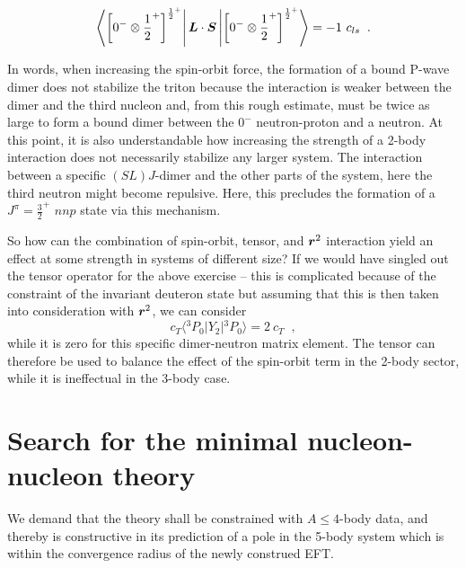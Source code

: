 \documentclass[aps,prd,twocolumn
,tightenlines,letterpaper,
nofootinbib]{revtex4-1}
\begin{document}
$$\left\langle\left[0^-\otimes \frac{1}{2}^+\right]^{\frac{1}{2}^+}\right\vert\boldsymbol{L}\cdot\boldsymbol{S}\left\vert\left[0^-\otimes \frac{1}{2}^+\right]^{\frac{1}{2}^+}\right\rangle=-1~c_{ls}\;\;.$$

In words, when increasing the spin-orbit force, the formation of a bound P-wave
dimer does not stabilize the triton because the interaction is weaker between the
dimer and the third nucleon and, from this rough estimate, must be twice as
large to form a bound dimer between the $0^-$ neutron-proton and a neutron.
At this point, it is also understandable how increasing the strength of a 2-body
interaction does not necessarily stabilize any larger system. The interaction 
between a specific $(SL)J$-dimer and the other parts of the system, here the third
neutron might become repulsive. Here, this precludes the formation of a
$J^\pi=\frac{3}{2}^+$ $nnp$ state via this mechanism.

So how can the combination of spin-orbit, tensor, and $\boldsymbol{r}^2$ interaction
yield an effect at some strength in systems of different size?
If we would have singled out the tensor operator for the above exercise -- this
is complicated because of the constraint of the invariant deuteron state but
assuming that this is then taken into consideration with $\boldsymbol{r}^2$, we can
consider
$$c_{T}\langle{}^3P_0\vert Y_2\vert{}^3P_0\rangle=2~c_{T}\;\;,$$
while it is zero for this specific dimer-neutron matrix element.
The tensor can therefore be used to balance the effect of the spin-orbit term
in the 2-body sector, while it is ineffectual in the 3-body case.

\section{Search for the minimal nucleon-nucleon theory}
We demand that the theory shall be constrained with $A\leq 4$-body data, and thereby
is constructive in its prediction of a pole in the 5-body system which is within the
convergence radius of the newly construed EFT.
\end{document}

